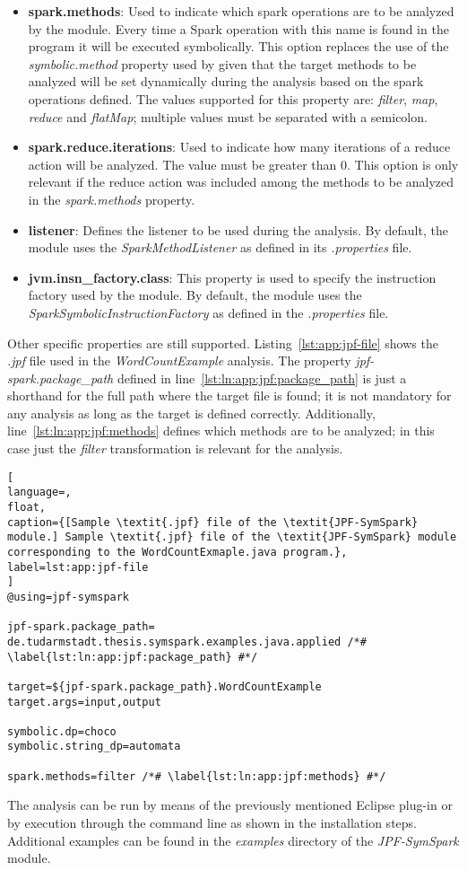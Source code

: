 \begin{itemize}
	\item \textbf{spark.methods}: Used to indicate which spark operations are to be analyzed by the module. Every time a Spark operation with this name is found in the program it will be executed symbolically. This option replaces the use of the \textit{symbolic.method} property used by \spf{} given that the target methods to be analyzed will be set dynamically during the analysis based on the spark operations defined. The values supported for this property are: \textit{filter}, \textit{map}, \textit{reduce} and \textit{flatMap}; multiple values must be separated with a semicolon.
	\item \textbf{spark.reduce.iterations}: Used to indicate how many iterations of a reduce action will be analyzed. The value must be greater than 0. This option is only relevant if the reduce action was included among the methods to be analyzed in the \textit{spark.methods} property.
	\item \textbf{listener}: Defines the listener to be used during the analysis. By default, the module uses the \textit{SparkMethodListener} as defined in its \textit{.properties} file.
	\item \textbf{jvm.insn\_factory.class}: This property is used to specify the instruction factory used by the module. By default, the module uses the \textit{SparkSymbolicInstructionFactory} as defined in the \textit{.properties} file.
\end{itemize}

Other \spf{} specific properties are still supported. Listing~\ref{lst:app:jpf-file} shows the \textit{.jpf} file used in the \textit{WordCountExample} analysis. The property \textit{jpf-spark.package\_path} defined in line~\ref{lst:ln:app:jpf:package_path} is just a shorthand for the full path where the target file is found; it is not mandatory for any analysis as long as the target is defined correctly. Additionally, line~\ref{lst:ln:app:jpf:methods} defines which methods are to be analyzed; in this case just the \textit{filter} transformation is relevant for the analysis.

\begin{lstlisting}[
language=,
float,
caption={[Sample \textit{.jpf} file of the \textit{JPF-SymSpark} module.] Sample \textit{.jpf} file of the \textit{JPF-SymSpark} module corresponding to the WordCountExmaple.java program.},
label=lst:app:jpf-file
]
@using=jpf-symspark

jpf-spark.package_path= de.tudarmstadt.thesis.symspark.examples.java.applied /*# \label{lst:ln:app:jpf:package_path} #*/

target=${jpf-spark.package_path}.WordCountExample
target.args=input,output

symbolic.dp=choco
symbolic.string_dp=automata

spark.methods=filter /*# \label{lst:ln:app:jpf:methods} #*/
\end{lstlisting}

The analysis can be run by means of the previously mentioned Eclipse plug-in or by execution through the command line as shown in the installation steps. Additional examples can be found in the \textit{examples} directory of the \textit{JPF-SymSpark} module.